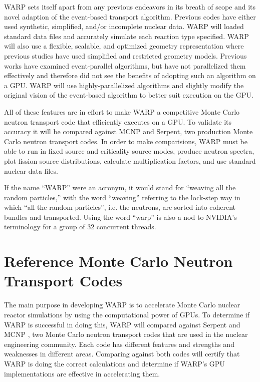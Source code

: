 WARP sets itself apart from any previous endeavors in its breath of scope and its novel adaption of the event-based transport algorithm.  Previous codes have either used synthetic, simplified, and/or incomplete nuclear data.  WARP will loaded standard data files and accurately simulate each reaction type specified.  WARP will also use a flexible, scalable, and optimized geometry representation where previous studies have used simplified and restricted geometry models.  Previous works have examined event-parallel algorithms, but have not parallelized them effectively and therefore did not see the benefits of adopting such an algorithm on a GPU.  WARP will use highly-parallelized algorithms and slightly modify the original vision of the event-based algorithm to better suit execution on the GPU. 

All of these features are in effort to make WARP a competitive Monte Carlo neutron transport code that efficiently executes on a GPU.  To validate its accuracy it will be compared against MCNP and Serpent, two production Monte Carlo neutron transport codes.  In order to make comparisions,  WARP must be able to run in fixed source and criticality source modes, produce neutron spectra, plot fission source distributions, calculate multiplication factors, and use standard nuclear data files.  

If the name ``WARP'' were an acronym, it would stand for ``weaving all the random particles,'' with the word ``weaving'' referring to the lock-step way in which ``all the random particles'', i.e. the neutrons, are sorted into coherent bundles and transported.  Using the word ``warp'' is also a nod to NVIDIA's terminology for a group of 32 concurrent threads.

\section{Reference Monte Carlo Neutron Transport Codes}

The main purpose in developing WARP is to accelerate Monte Carlo nuclear reactor simulations by using the computational power of GPUs.  To determine if WARP is successful in doing this, WARP will compared against Serpent \cite{jaakko} and MCNP \cite{mcnp}, two Monte Carlo neutron transport codes that are used in the nuclear engineering community.  Each code has different features and strengths and weaknesses in different areas. Comparing against both codes will certify that WARP is doing the correct calculations and determine if WARP's GPU implementations are effective in accelerating them.  

